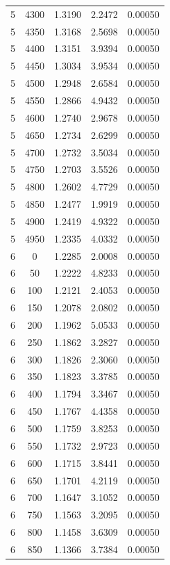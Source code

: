 \begin{longtable}{ccccc}
    5 & 4300 & 1.3190 & 2.2472 & 0.00050 \\
    5 & 4350 & 1.3168 & 2.5698 & 0.00050 \\
    5 & 4400 & 1.3151 & 3.9394 & 0.00050 \\
    5 & 4450 & 1.3034 & 3.9534 & 0.00050 \\
    5 & 4500 & 1.2948 & 2.6584 & 0.00050 \\
    5 & 4550 & 1.2866 & 4.9432 & 0.00050 \\
    5 & 4600 & 1.2740 & 2.9678 & 0.00050 \\
    5 & 4650 & 1.2734 & 2.6299 & 0.00050 \\
    5 & 4700 & 1.2732 & 3.5034 & 0.00050 \\
    5 & 4750 & 1.2703 & 3.5526 & 0.00050 \\
    5 & 4800 & 1.2602 & 4.7729 & 0.00050 \\
    5 & 4850 & 1.2477 & 1.9919 & 0.00050 \\
    5 & 4900 & 1.2419 & 4.9322 & 0.00050 \\
    5 & 4950 & 1.2335 & 4.0332 & 0.00050 \\
    6 & 0 & 1.2285 & 2.0008 & 0.00050 \\
    6 & 50 & 1.2222 & 4.8233 & 0.00050 \\
    6 & 100 & 1.2121 & 2.4053 & 0.00050 \\
    6 & 150 & 1.2078 & 2.0802 & 0.00050 \\
    6 & 200 & 1.1962 & 5.0533 & 0.00050 \\
    6 & 250 & 1.1862 & 3.2827 & 0.00050 \\
    6 & 300 & 1.1826 & 2.3060 & 0.00050 \\
    6 & 350 & 1.1823 & 3.3785 & 0.00050 \\
    6 & 400 & 1.1794 & 3.3467 & 0.00050 \\
    6 & 450 & 1.1767 & 4.4358 & 0.00050 \\
    6 & 500 & 1.1759 & 3.8253 & 0.00050 \\
    6 & 550 & 1.1732 & 2.9723 & 0.00050 \\
    6 & 600 & 1.1715 & 3.8441 & 0.00050 \\
    6 & 650 & 1.1701 & 4.2119 & 0.00050 \\
    6 & 700 & 1.1647 & 3.1052 & 0.00050 \\
    6 & 750 & 1.1563 & 3.2095 & 0.00050 \\
    6 & 800 & 1.1458 & 3.6309 & 0.00050 \\
    6 & 850 & 1.1366 & 3.7384 & 0.00050 \\

\end{longtable}
